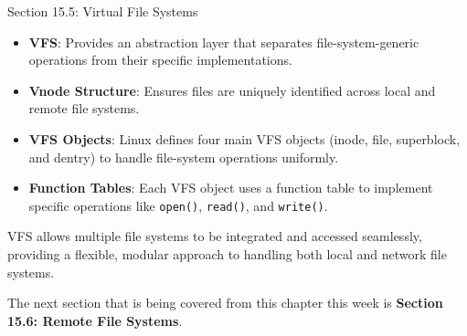 \begin{notes}{Section 15.5: Virtual File Systems}
\begin{highlight}
    \end{highlight}
    
    \begin{highlight}
    
        \begin{itemize}
            \item \textbf{VFS}: Provides an abstraction layer that separates file-system-generic operations from their specific implementations.
            \item \textbf{Vnode Structure}: Ensures files are uniquely identified across local and remote file systems.
            \item \textbf{VFS Objects}: Linux defines four main VFS objects (inode, file, superblock, and dentry) to handle file-system operations uniformly.
            \item \textbf{Function Tables}: Each VFS object uses a function table to implement specific operations like \texttt{open()}, \texttt{read()}, and \texttt{write()}.
        \end{itemize}
    
    VFS allows multiple file systems to be integrated and accessed seamlessly, providing a flexible, modular approach to handling both local and network file systems.
    
    \end{highlight}
\end{notes}

The next section that is being covered from this chapter this week is \textbf{Section 15.6: Remote File Systems}.

